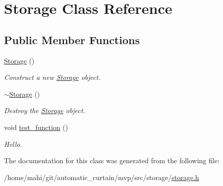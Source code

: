 \hypertarget{classStorage}{}\section{Storage Class Reference}
\label{classStorage}
\subsection*{Public Member Functions}
\begin{DoxyCompactItemize}
\item 
\mbox{\label{classStorage_a80ef6af5e4c9fd4424ae16e808d05291}} 
\hyperlink{classStorage_a80ef6af5e4c9fd4424ae16e808d05291}{Storage} ()
\begin{DoxyCompactList}\small\item\em Construct a new \hyperlink{classStorage}{Storage} object. \end{DoxyCompactList}\item 
\mbox{\label{classStorage_a73cf30f0a34250396f9eabee7dc5c93d}} 
\hyperlink{classStorage_a73cf30f0a34250396f9eabee7dc5c93d}{$\sim$\+Storage} ()
\begin{DoxyCompactList}\small\item\em Destroy the \hyperlink{classStorage}{Storage} object. \end{DoxyCompactList}\item 
\mbox{\label{classStorage_a0cdf803ccf0ea01b54103d2bf04c66d5}} 
void \hyperlink{classStorage_a0cdf803ccf0ea01b54103d2bf04c66d5}{test\+\_\+function} ()
\begin{DoxyCompactList}\small\item\em Hello. \end{DoxyCompactList}\end{DoxyCompactItemize}


The documentation for this class was generated from the following file\+:\begin{DoxyCompactItemize}
\item 
/home/mahi/git/automatic\+\_\+curtain/mvp/src/storage/\hyperlink{storage_8h}{storage.\+h}\end{DoxyCompactItemize}
